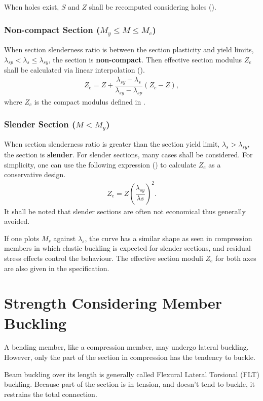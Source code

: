 When holes exist, $S$ and $Z$ shall be recomputed considering holes ().
\subsubsection{Non-compact Section ($M_y\leqslant{}M\leqslant{}M_c$)}
When section slenderness ratio is between the section plasticity and yield limits, $\lambda_{sp}<\lambda_s\leqslant\lambda_{sy}$, the section is \textbf{non-compact}. Then effective section modulus $Z_e$ shall be calculated via linear interpolation ().
\begin{gather}
Z_e=Z+\dfrac{\lambda_{sy}-\lambda_s}{\lambda_{sy}-\lambda_{sp}}\left(Z_c-Z\right),
\end{gather}
where $Z_c$ is the compact modulus defined in .
\subsubsection{Slender Section ($M<M_y$)}
When section slenderness ratio is greater than the section yield limit, $\lambda_s>\lambda_{sy}$, the section is \textbf{slender}. For slender sections, many cases shall be considered. For simplicity, one can use the following expression () to calculate $Z_e$ as a conservative design.
\begin{gather}
Z_e=Z\left(\dfrac{\lambda_{sy}}{\lambda{s}}\right)^2.
\end{gather}
It shall be noted that slender sections are often not economical thus generally avoided.

If one plots $M_s$ against $\lambda_s$, the curve has a similar shape as seen in compression members in which elastic buckling is expected for slender sections, and residual stress effects control the behaviour. The effective section moduli $Z_e$ for both axes are also given in the specification.
\begin{figure}[H]
\centering
\end{figure}
\section{Strength Considering Member Buckling}
A bending member, like a compression member, may undergo lateral buckling. However, only the part of the section in compression has the tendency to buckle.
\begin{figure}[H]
\centering
\end{figure}
Beam buckling over its length is generally called Flexural Lateral Torsional (FLT) buckling. Because part of the section is in tension, and doesn't tend to buckle, it restrains the total connection.
\begin{figure}[H]
\centering
\end{figure}

